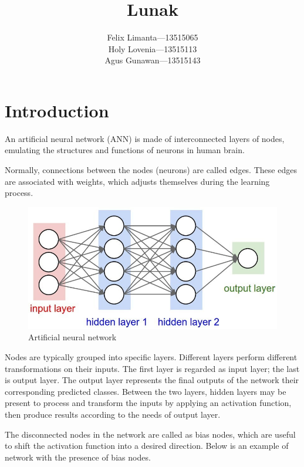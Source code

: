 \documentclass[11pt]{article}
\title{Lunak \\ [0.2em]\smaller{A Feed-forward Artificial Neural Network Implemented in Python}}
\author{Felix Limanta—13515065 \\ Holy Lovenia—13515113 \\ Agus Gunawan—13515143}
\makeatletter
\def\maxwidth{\ifdim\Gin@nat@width>\linewidth\linewidth
    \else\Gin@nat@width\fi}
\let\Oldincludegraphics\includegraphics
\renewcommand{\includegraphics}[1]{\Oldincludegraphics[width=.8\maxwidth]{#1}}
\makeatother
\begin{document}
    
    
    \maketitle
    
    
    \hypertarget{introduction}{%
\section{Introduction}\label{introduction}}

An artificial neural network (ANN) is made of interconnected layers of
nodes, emulating the structures and functions of neurons in human brain.

Normally, connections between the nodes (neurons) are called edges.
These edges are associated with weights, which adjusts themselves during
the learning process.

\begin{figure}[h]
\centering
\includegraphics{img/artificial_neural_network_1-791x388.jpg}
\caption{Artificial neural network}
\end{figure}

Nodes are typically grouped into specific layers. Different layers
perform different transformations on their inputs. The first layer is
regarded as input layer; the last is output layer. The output layer
represents the final outputs of the network their corresponding
predicted classes. Between the two layers, hidden layers may be present
to process and transform the inputs by applying an activation function,
then produce results according to the needs of output layer.

The disconnected nodes in the network are called as bias nodes, which
are useful to shift the activation function into a desired direction.
Below is an example of network with the presence of bias nodes.
\end{document}
